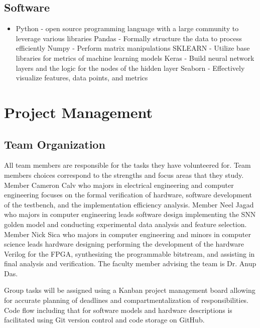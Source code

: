\documentclass[12pt,titlepage]{article}
\begin{document}
\subsection{Software}
\begin{itemize}
	\item Python - open source programming language with a large community to leverage various libraries
		\subitem Pandas - Formally structure the data to process efficiently
		\subitem Numpy - Perform matrix manipulations 
		\subitem SKLEARN - Utilize base libraries for metrics of machine learning models
		\subitem Keras - Build neural network layers and the logic for the nodes of the hidden layer
		\subitem Seaborn - Effectively visualize features, data points, and metrics
\end{itemize}	

\section{Project Management}
\subsection{Team Organization}
All team members are responsible for the tasks they have volunteered for. Team members choices correspond to the strengths and focus areas that they study.
Member Cameron Calv who majors in electrical engineering and computer engineering focuses on the formal verification of hardware, software development of
the testbench, and the implementation efficiency analysis. Member Neel Jagad who majors in computer engineering leads software design implementing the SNN
golden model and conducting experimental data analysis and feature selection. Member Nick Sica who majors in computer engineering and minors in computer
science leads hardware designing performing the development of the hardware Verilog for the FPGA, synthesizing the programmable bitstream, and assisting in
final analysis and verification. The faculty member advising the team is Dr. Anup Das. 

Group tasks will be assigned using a Kanban project management board allowing for accurate planning of deadlines and compartmentalization of responsibilities.
Code flow including that for software models and hardware descriptions is facilitated using Git version control and code storage on GitHub. 
\end{document}
